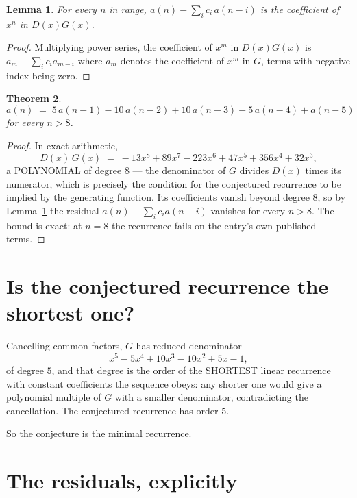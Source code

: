 \documentclass[11pt,a4paper]{article}
\theoremstyle{plain}
\newtheorem{theorem}{Theorem}
\newtheorem{lemma}[theorem]{Lemma}
\theoremstyle{definition}
\begin{document}
\begin{lemma}\label{lem:key}
For every $n$ in range, $a(n)-\sum_i c_i\,a(n-i)$ is the coefficient of $x^{n}$ in
$D(x)G(x)$.
\end{lemma}

\begin{proof}
Multiplying power series, the coefficient of $x^{m}$ in $D(x)G(x)$ is
$a_m-\sum_i c_i a_{m-i}$ where $a_m$ denotes the coefficient of $x^{m}$ in $G$, terms with
negative index being zero.
\end{proof}

\begin{theorem}
\[
a(n)\;=\;5\,a(n-1) - 10\,a(n-2) + 10\,a(n-3) - 5\,a(n-4) + a(n-5)
\]
for every $n>8$.
\end{theorem}

\begin{proof}
In exact arithmetic,
\[
D(x)\,G(x)\;=\;- 13 x^{8} + 89 x^{7} - 223 x^{6} + 47 x^{5} + 356 x^{4} + 32 x^{3},
\]
a POLYNOMIAL of degree $8$ --- the denominator of $G$ divides $D(x)$ times its numerator,
which is precisely the condition for the conjectured recurrence to be implied by the
generating function. Its coefficients vanish beyond degree $8$, so by
Lemma~\ref{lem:key} the residual $a(n)-\sum_ic_ia(n-i)$ vanishes for every
$n>8$. The bound is exact: at $n=8$ the recurrence fails on the entry's own published terms.
\end{proof}

\section{Is the conjectured recurrence the shortest one?}

Cancelling common factors, $G$ has reduced denominator
\[
x^{5} - 5 x^{4} + 10 x^{3} - 10 x^{2} + 5 x - 1,
\]
of degree $5$, and that degree is the order of the SHORTEST linear recurrence with
constant coefficients the sequence obeys: any shorter one would give a polynomial multiple of
$G$ with a smaller denominator, contradicting the cancellation. The conjectured recurrence has
order $5$.

So the conjecture is the minimal recurrence.

\section{The residuals, explicitly}
\end{document}
